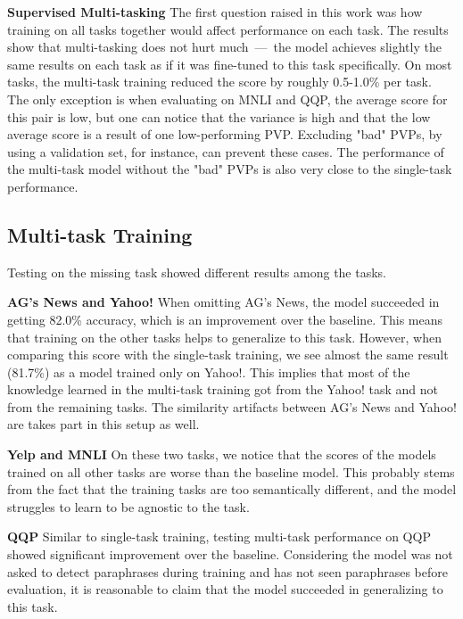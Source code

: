 \documentclass[11pt,a4paper]{article}
\newcommand{\subtitle}[1]{\vspace{5pt}\noindent\textbf{#1}\quad}
\begin{document}
\subtitle{Supervised Multi-tasking}
The first question raised in this work was how training on all tasks together would affect performance on each task.
The results show that multi-tasking does not hurt much~---~the model achieves slightly the same results on each task as if it was fine-tuned to this task specifically.
On most tasks, the multi-task training reduced the score by roughly 0.5-1.0\% per task.
The only exception is when evaluating on MNLI and QQP, the average score for this pair is low, but one can notice that the variance is high and that the low average score is a result of one low-performing PVP.
Excluding "bad" PVPs, by using a validation set, for instance, can prevent these cases.
The performance of the multi-task model without the "bad" PVPs is also very close to the single-task performance.


\subsection{Multi-task Training}
Testing on the missing task showed different results among the tasks.
 
\subtitle{AG's News and Yahoo!}
When omitting AG's News, the model succeeded in getting 82.0\% accuracy, which is an improvement over the baseline.
This means that training on the other tasks helps to generalize to this task.
However, when comparing this score with the single-task training, we see almost the same result (81.7\%) as a model trained only on Yahoo!.
This implies that most of the knowledge learned in the multi-task training got from the Yahoo! task and not from the remaining tasks.
The similarity artifacts between AG's News and Yahoo! are takes part in this setup as well.

\subtitle{Yelp and MNLI}
On these two tasks, we notice that the scores of the models trained on all other tasks are worse than the baseline model.
This probably stems from the fact that the training tasks are too semantically different, and the model struggles to learn to be agnostic to the task.


\subtitle{QQP}
Similar to single-task training, testing multi-task performance on QQP showed significant improvement over the baseline.
Considering the model was not asked to detect paraphrases during training and has not seen paraphrases before evaluation, it is reasonable to claim that the model succeeded in generalizing to this task.\\
\end{document}

